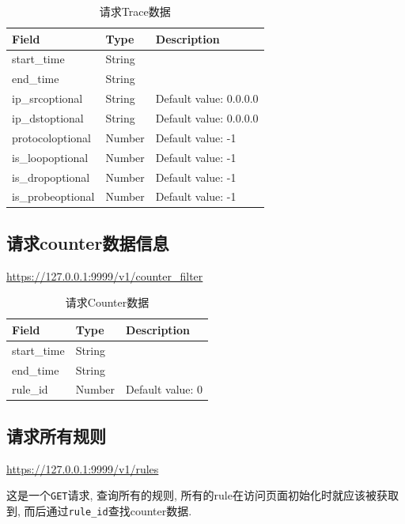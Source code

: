 \begin{table}[]
    \centering
    \caption{请求Trace数据}
    \label{tbl:get_trace}
    \begin{tabular}{lll} \hline
    Field             & Type   & Description            \\ \hline
    start\_time       & String &                        \\
    end\_time         & String &                        \\
    ip\_srcoptional   & String & Default value: 0.0.0.0 \\
    ip\_dstoptional   & String & Default value: 0.0.0.0 \\
    protocoloptional  & Number & Default value: -1      \\
    is\_loopoptional  & Number & Default value: -1      \\
    is\_dropoptional  & Number & Default value: -1      \\
    is\_probeoptional & Number & Default value: -1      \\ \hline
    \end{tabular}
\end{table}

\subsection{请求counter数据信息}

\url{https://127.0.0.1:9999/v1/counter_filter}

\begin{table}[]
    \centering
    \caption{请求Counter数据}
    \label{tbl:get_counter}
    \begin{tabular}{lll}  \hline
    Field       & Type   & Description      \\ \hline
    start\_time & String &                  \\
    end\_time   & String &                  \\
    rule\_id    & Number & Default value: 0 \\ \hline
    \end{tabular}
\end{table}

\subsection{请求所有规则}

\url{https://127.0.0.1:9999/v1/rules}

这是一个\texttt{GET}请求, 查询所有的规则, 所有的rule在访问页面初始化时就应该被获取到,
而后通过\texttt{rule\_id}查找counter数据.


